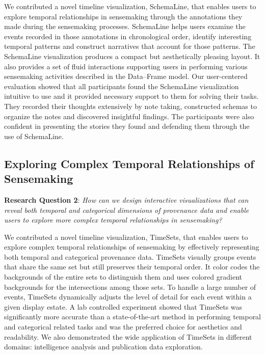 We contributed a novel timeline visualization, SchemaLine, that enables users to explore temporal relationships in sensemaking through the annotations they made during the sensemaking processes. SchemaLine helps users examine the events recorded in those annotations in chronological order, identify interesting temporal patterns and construct narratives that account for those patterns. The SchemaLine visualization produces a compact but aesthetically pleasing layout. It also provides a set of fluid interactions supporting users in performing various sensemaking activities described in the Data--Frame model. Our user-centered evaluation showed that all participants found the SchemaLine visualization intuitive to use and it provided necessary support to them for solving their tasks. They recorded their thoughts extensively by note taking, constructed schemas to organize the notes and discovered insightful findings. The participants were also confident in presenting the stories they found and defending them through the use of SchemaLine.

\subsection{Exploring Complex Temporal Relationships of Sensemaking}
\textbf{Research Question 2}: \emph{How can we design interactive visualizations that can reveal both temporal and categorical dimensions of provenance data and enable users to explore more complex temporal relationships in sensemaking?}

We contributed a novel timeline visualization, TimeSets, that enables users to explore complex temporal relationships of sensemaking by effectively representing both temporal and categorical provenance data. TimeSets visually groups events that share the same set but still preserves their temporal order. It color codes the backgrounds of the entire sets to distinguish them and uses colored gradient backgrounds for the intersections among those sets. To handle a large number of events, TimeSets dynamically adjusts the level of detail for each event within a given display estate. A lab controlled experiment showed that TimeSets was significantly more accurate than a state-of-the-art method in performing temporal and categorical related tasks and was the preferred choice for aesthetics and readability. We also demonstrated the wide application of TimeSets in different domains: intelligence analysis and publication data exploration.

